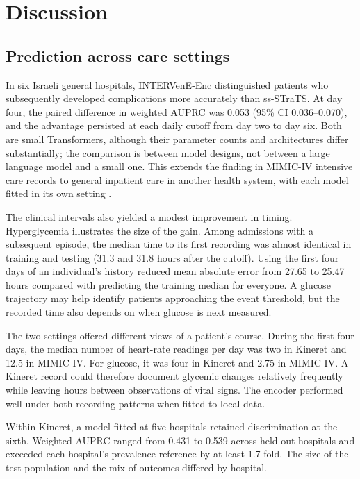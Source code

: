 \section{Discussion}
\label{sec:discussion}
\subsection{Prediction across care settings}
In six Israeli general hospitals, INTERVenE-Enc distinguished patients who subsequently developed complications more accurately than ss-STraTS. At day four, the paired difference in weighted AUPRC was 0.053 (95\% CI 0.036--0.070), and the advantage persisted at each daily cutoff from day two to day six. Both are small Transformers, although their parameter counts and architectures differ substantially; the comparison is between model designs, not between a large language model and a small one. This extends the finding in MIMIC-IV intensive care records to general inpatient care in another health system, with each model fitted in its own setting \citep{oded2026intervene}.

The clinical intervals also yielded a modest improvement in timing. Hyperglycemia illustrates the size of the gain. Among admissions with a subsequent episode, the median time to its first recording was almost identical in training and testing (31.3 and 31.8 hours after the cutoff). Using the first four days of an individual's history reduced mean absolute error from 27.65 to 25.47 hours compared with predicting the training median for everyone. A glucose trajectory may help identify patients approaching the event threshold, but the recorded time also depends on when glucose is next measured.

The two settings offered different views of a patient's course. During the first four days, the median number of heart-rate readings per day was two in Kineret and 12.5 in MIMIC-IV. For glucose, it was four in Kineret and 2.75 in MIMIC-IV. A Kineret record could therefore document glycemic changes relatively frequently while leaving hours between observations of vital signs. The encoder performed well under both recording patterns when fitted to local data.

Within Kineret, a model fitted at five hospitals retained discrimination at the sixth. Weighted AUPRC ranged from 0.431 to 0.539 across held-out hospitals and exceeded each hospital's prevalence reference by at least 1.7-fold. The size of the test population and the mix of outcomes differed by hospital.

